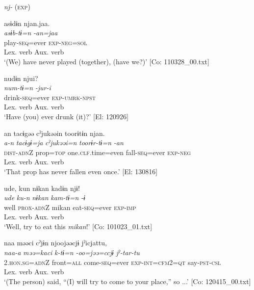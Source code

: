 \ea   \textit{nj-} (\textsc{exp}) \label{ex:9.10}

\ea %
 \gllll  asɨdɨn  njan.jaa.\\
      \textit{asɨb-tɨ=n}  \textit{-an=jaa}\\
      play-\textsc{seq}=ever  \textsc{exp}-\textsc{neg}=\textsc{sol}\\
      {Lex. verb}  {Aux. verb}\\
      \glt       ‘(We) have never played (together), (have we?)’ [Co: 110328\_00.txt]

\ex \label{ex:9.10b} %
      \gllll    nudɨn  njui?\\
      \textit{num-tɨ=n}  \textit{-jur-i}\\
      drink-\textsc{seq}=ever  \textsc{exp}-\textsc{umrk}-\textsc{npst}\\
      {Lex. verb}  {Aux. verb}\\
      \glt       ‘Have (you) ever drunk (it)?’ [El: 120926]

\ex \label{ex:9.10c} %
     \gllll an  tacɨgəə  cˀjukəəin  toorɨtɨn  njan.\\
      \textit{a-n}  \textit{tacɨgɨ=ja}  \textit{cˀjukəəi=n}  \textit{toorɨr-tɨ=n}  \textit{-an}\\
      \textsc{dist}-\textsc{adn}Z  prop=\textsc{top}  one.\textsc{clf}.time=even  fall-\textsc{seq}=ever  \textsc{exp}-\textsc{neg}\\
       {}  {}  {} {Lex. verb}  {Aux. verb}\\
      \glt       ‘That prop has never fallen even once.’ [El: 130816]

\ex \label{ex:9.10d} %
   \gllll   ude,  kun  nɨkan  kadɨn  njɨ!\\
      \textit{ude}  \textit{ku-n}  \textit{nɨkan}  \textit{kam-tɨ=n}  \textit{-ɨ}\\
      well  \textsc{prox}-\textsc{adn}Z  mikan  eat-\textsc{seq}=ever  \textsc{exp}-\textsc{imp}\\
      {}  {} {}   {Lex. verb}  {Aux. verb}\\
      \glt       ‘Well, try to eat this \textit{mikan}!’ [Co: 101023\_01.txt]

\ex \label{ex:9.10e} %
   \gllll naa  məəci  cˀjɨn  njoojəəcjɨ    jˀicjattu,\\
      \textit{naa-a}  \textit{məə=kaci}  \textit{k-tɨ=n}  \textit{-oo=jəə=ccjɨ}   \textit{jˀ-tar-tu}\\
      2.\textsc{hon}.\textsc{sg}=\textsc{adn}Z  front=\textsc{all}  come-\textsc{seq}=ever  \textsc{exp}-\textsc{int}=\textsc{cfm}2=\textsc{qt}  say-\textsc{pst}-\textsc{csl}\\
        {} {} {Lex. verb}  {Aux. verb}\\          
      \glt ‘(The person) said, “(I) will try to come to your place,” so ...’    [Co: 120415\_00.txt]
    \z
\z

